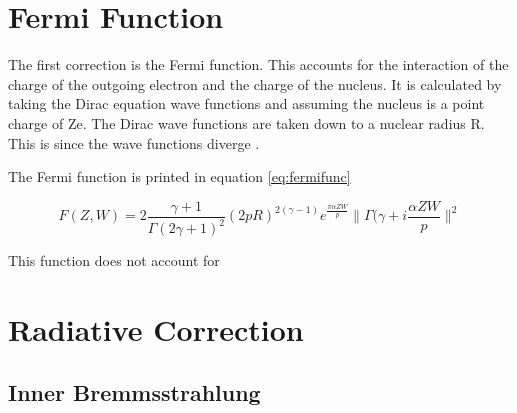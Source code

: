 \section{Fermi Function}

The first correction is the Fermi function.
This accounts for the interaction of the charge of the outgoing electron and the charge of the nucleus.
It is calculated by taking the Dirac equation wave functions and assuming the nucleus is a point charge of Ze.
The Dirac wave functions are taken down to a nuclear radius R.
This is since the wave functions diverge \cite{Wil89}.

The Fermi function is printed in equation \ref{eq:fermifunc}

\begin{equation}
	F(Z,W) = 2\frac{\gamma + 1}{\Gamma(2\gamma +1)^{2}}(2pR)^{2(\gamma - 1)}e^{\frac{\pi\alpha ZW}{p}}\|\Gamma(\gamma + i\frac{\alpha ZW}{p}\|^{2}
	\label{eq:fermifunc}
\end{equation}

This function does not account for 
\section{Radiative Correction}

\subsection{Inner Bremmsstrahlung}
